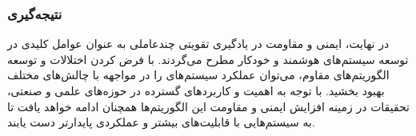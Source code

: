 \subsubsection{نتیجه‌گیری}

در نهایت، ایمنی و مقاومت در یادگیری تقویتی چندعاملی به عنوان عوامل کلیدی در توسعه سیستم‌های هوشمند و خودکار مطرح می‌گردند. با فرض کردن اختلالات و توسعه الگوریتم‌های مقاوم، می‌توان عملکرد سیستم‌های  را در مواجهه با چالش‌های مختلف بهبود بخشید. با توجه به اهمیت و کاربردهای گسترده  در حوزه‌های علمی و صنعتی، تحقیقات در زمینه افزایش ایمنی و مقاومت این الگوریتم‌ها همچنان ادامه خواهد یافت تا به سیستم‌هایی با قابلیت‌های بیشتر و عملکردی پایدارتر دست یابند.
